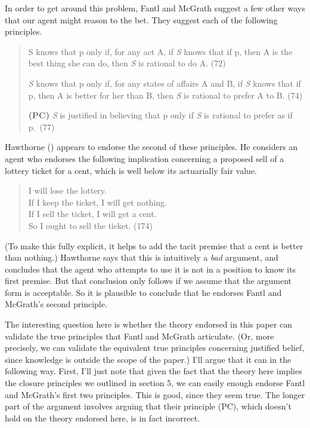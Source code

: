 \documentclass[
  11pt,
  letterpaper,
  DIV=11,
  numbers=noendperiod,
  twoside]{scrartcl}
\begin{document}
In order to get around this problem, Fantl and McGrath suggest a few
other ways that our agent might reason to the bet. They suggest each of
the following principles.

\begin{quote}
S knows that p only if, for any act A, if \emph{S} knows that if p, then
A is the best thing she can do, then \emph{S} is rational to do A. (72)

\emph{S} knows that p only if, for any states of affairs A and B, if
\emph{S} knows that if p, then A is better for her than B, then \emph{S}
is rational to prefer A to B. (74)

\textbf{(PC)} \emph{S} is justified in believing that p only if \emph{S}
is rational to prefer as if p.~(77)
\end{quote}

Hawthorne () appears to
endorse the second of these principles. He considers an agent who
endorses the following implication concerning a proposed sell of a
lottery ticket for a cent, which is well below its actuarially fair
value.

\begin{quote}
I will lose the lottery.\\
If I keep the ticket, I will get nothing.\\
If I sell the ticket, I will get a cent.\\
So I ought to sell the ticket. (174)
\end{quote}

(To make this fully explicit, it helps to add the tacit premise that a
cent is better than nothing.) Hawthorne says that this is intuitively a
\emph{bad} argument, and concludes that the agent who attempts to use it
is not in a position to know its first premise. But that conclusion only
follows if we assume that the argument form is acceptable. So it is
plausible to conclude that he endorses Fantl and McGrath's second
principle.

The interesting question here is whether the theory endorsed in this
paper can validate the true principles that Fantl and McGrath
articulate. (Or, more precisely, we can validate the equivalent true
principles concerning justified belief, since knowledge is outside the
scope of the paper.) I'll argue that it can in the following way. First,
I'll just note that given the fact that the theory here implies the
closure principles we outlined in section 5, we can easily enough
endorse Fantl and McGrath's first two principles. This is good, since
they seem true. The longer part of the argument involves arguing that
their principle (PC), which doesn't hold on the theory endorsed here, is
in fact incorrect.
\end{document}
